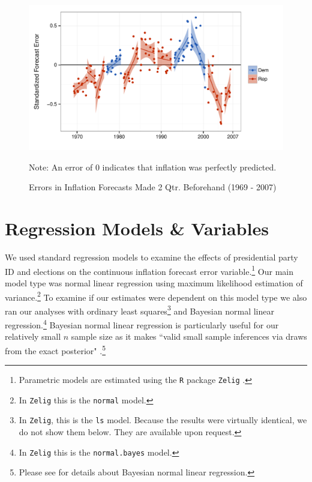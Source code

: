 \documentclass[a4paper]{article}\usepackage[]{graphicx}\usepackage[]{color}
\newenvironment{knitrout}{}{} %
\begin{document}
\begin{figure}[t]
    \caption{Errors in Inflation Forecasts Made 2 Qtr. Beforehand (1969 - 2007)}
    \label{errors_over_time}
    \begin{center}
    
\begin{knitrout}
\color{fgcolor}

{\centering \includegraphics[width=0.8\linewidth]{figure/PartisanError} 

}



\end{knitrout}

    
    \end{center}
    \begin{singlespace}
        {\scriptsize{Note: An error of 0 indicates that inflation was perfectly predicted.}}
    \end{singlespace}
\end{figure}




\section{Regression Models \& Variables}

We used standard regression models to examine the effects of presidential party ID and elections on the continuous inflation forecast error variable.\footnote{Parametric models are estimated using the \texttt{R} package \texttt{Zelig} \citep{Zelig2012}.} Our main model type was normal linear regression using maximum likelihood estimation of variance.\footnote{In {\tt{Zelig}} this is the {\tt{normal}} model.} To examine if our estimates were dependent on this model type we also ran our analyses with ordinary least squares\footnote{In \texttt{Zelig}, this is the \texttt{ls} model. Because the results were virtually identical, we do not show them below. They are available upon request.} and Bayesian normal linear regression.\footnote{In {\tt{Zelig}} this is the {\tt{normal.bayes}} model.} Bayesian normal linear regression is particularly useful for our relatively small $n$ sample size as it makes ``valid small sample inferences via draws from the exact posterior" \citep[][38]{Zelig2012}.\footnote{Please see \cite{Goodrich2007} for details about Bayesian normal linear regression.} 
\end{document}
